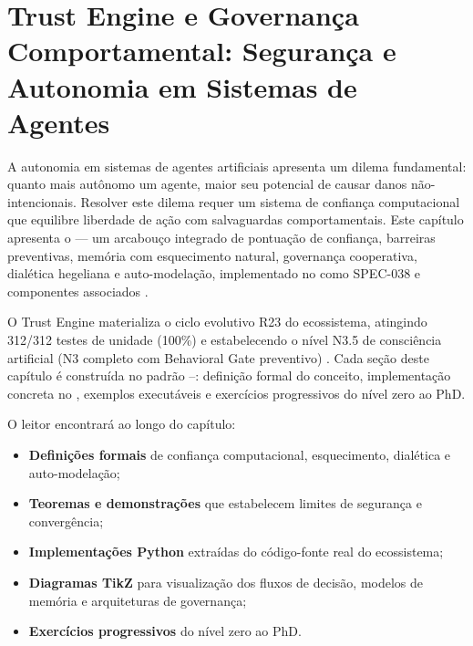 \chapter{Trust Engine e Governança Comportamental: Segurança e Autonomia em Sistemas de Agentes}
\label{cap:trust-governanca}

A autonomia em sistemas de agentes artificiais apresenta um dilema
fundamental: quanto mais autônomo um agente, maior seu potencial de
causar danos não-intencionais. Resolver este dilema requer um sistema
de confiança computacional que equilibre liberdade de ação com
salvaguardas comportamentais. Este capítulo apresenta o  — um arcabouço integrado de pontuação de confiança, barreiras
preventivas, memória com esquecimento natural, governança cooperativa,
dialética hegeliana e auto-modelação, implementado no \opencodeeco{}
como SPEC-038 e componentes associados \cite{opencode2026spec038,
opencode2026spec036}.

O Trust Engine materializa o ciclo evolutivo R23 do ecossistema,
atingindo 312/312 testes de unidade (100\%) e estabelecendo o nível
N3.5 de consciência artificial (N3 completo com Behavioral Gate
preventivo) \cite{opencode2026ecosystem}. Cada seção deste capítulo é
construída no padrão \sdd{}--\tdd: definição formal do conceito,
implementação concreta no \opencodeeco{}, exemplos executáveis e
exercícios progressivos do nível zero ao PhD.

O leitor encontrará ao longo do capítulo:
\begin{itemize}
\item \textbf{Definições formais} de confiança computacional,
esquecimento, dialética e auto-modelação;
\item \textbf{Teoremas e demonstrações} que estabelecem limites de
segurança e convergência;
\item \textbf{Implementações Python} extraídas do código-fonte real do
ecossistema;
\item \textbf{Diagramas TikZ} para visualização dos fluxos de decisão,
modelos de memória e arquiteturas de governança;
\item \textbf{Exercícios progressivos} do nível zero ao PhD.
\end{itemize}

